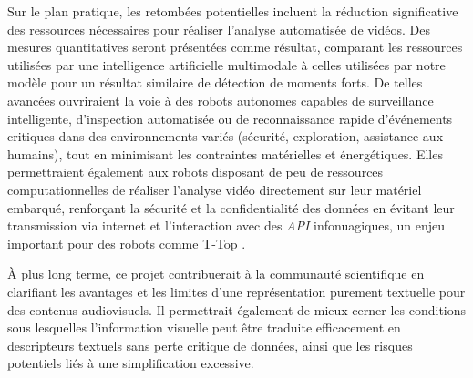 \documentclass[livre]{udes-genie-these}
\begin{document}
Sur le plan pratique, les retombées potentielles incluent la réduction significative des ressources nécessaires pour réaliser l'analyse automatisée de vidéos. Des mesures quantitatives seront présentées comme résultat, comparant les ressources utilisées par une intelligence artificielle multimodale à celles utilisées par notre modèle pour un résultat similaire de détection de moments forts. De telles avancées ouvriraient la voie à des robots autonomes capables de surveillance intelligente, d'inspection automatisée ou de reconnaissance rapide d'événements critiques dans des environnements variés (sécurité, exploration, assistance aux humains), tout en minimisant les contraintes matérielles et énergétiques. Elles permettraient également aux robots disposant de peu de ressources computationnelles de réaliser l’analyse vidéo directement sur leur matériel embarqué, renforçant la sécurité et la confidentialité des données en évitant leur transmission via internet et l’interaction avec des \textit{API} infonuagiques, un enjeu important pour des robots comme T-Top \cite{maheux2022_ttop}.

À plus long terme, ce projet contribuerait à la communauté scientifique en clarifiant les avantages et les limites d'une représentation purement textuelle pour des contenus audiovisuels. Il permettrait également de mieux cerner les conditions sous lesquelles l'information visuelle peut être traduite efficacement en descripteurs textuels sans perte critique de données, ainsi que les risques potentiels liés à une simplification excessive.
\end{document}
